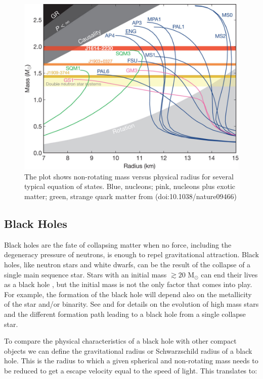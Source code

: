 \begin{figure}[]
        \centering
\includegraphics[scale=.3]{assets/images/es.jpg}
\caption{The plot shows non-rotating mass versus physical radius for several typical equation of states.  Blue, nucleons; pink, nucleons plus exotic matter; green, strange quark matter from (doi:10.1038/nature09466)}
\label{fig:nsmod}
\end{figure}

\subsection{Black Holes}\label{sec:bh}

Black holes are the fate of collapsing matter when no force, including the degeneracy pressure of neutrons, is enough to repel gravitational attraction. Black holes,  like neutron stars and white dwarfs, can be the result of the collapse of a single main sequence star. Stars with an initial mass $\gtrsim  20 \text{ M}_\odot $ can end their lives as a black hole \citep{heger_how_2003}, but the initial mass is not the only factor that comes into play. For example, the formation of the black hole will depend also on the metallicity of the star and/or binarity. See \cite{heger_how_2003} and \citep{brown_evolution_2000} for details on the evolution of high mass stars and the different formation path leading to a black hole from a single collapse star. 

To compare the physical characteristics of a black hole with other compact objects we can define the gravitational radius or Schwarzschild radius of a black hole. This is the radius to which a given spherical and non-rotating mass needs to be reduced to get a escape velocity equal to the speed of light. This translates to:

